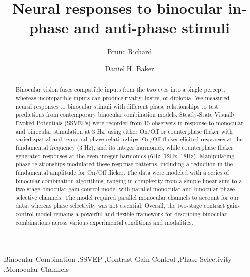 \documentclass[review,
  12pt,
]{elsarticle}
\begin{document}
\begin{frontmatter}

\title{Neural responses to binocular in-phase and anti-phase stimuli}

\author[inst1]{Bruno Richard}

\author[inst2]{Daniel H. Baker}

\address[inst1]{Department of Math and Computer Sciences, Rutgers University, Newark, New Jersey, USA}
\address[inst2]{Department of Psychology, University of York, York, UK}

\begin{abstract}
\begin{linenumbers}
Binocular vision fuses compatible inputs from the two eyes into a single
percept, whereas incompatible inputs can produce rivalry, lustre, or
diplopia. We measured neural responses to binocular stimuli with
different phase relationships to test predictions from contemporary
binocular combination models. Steady-State Visually Evoked Potentials
(SSVEPs) were recorded from 15 observers in response to monocular and
binocular stimulation at 3 Hz, using either On/Off or counterphase
flicker with varied spatial and temporal phase relationships. On/Off
flicker elicited responses at the fundamental frequency (3 Hz), and its
integer harmonics, while counterphase flicker generated responses at the
even integer harmonics (6Hz, 12Hz, 18Hz). Manipulating phase
relationships modulated these response patterns, including a reduction
in the fundamental amplitude for On/Off flicker. The data were modeled
with a series of binocular combination algorithms, ranging in complexity
from a simple linear sum to a two-stage binocular gain-control model
with parallel monocular and binocular phase-selective channels. The
model required parallel monocular channels to account for our data,
whereas phase selectivity was not essential. Overall, the two-stage
contrast gain-control model remains a powerful and flexible framework
for describing binocular combinations across various experimental
conditions and modalities.
\end{linenumbers}
\end{abstract}

\begin{keyword}
Binocular Combination \sep SSVEP \sep Contrast Gain Control \sep Phase Selectivity \sep Monocular Channels
\end{keyword}

\end{frontmatter}
\end{document}
